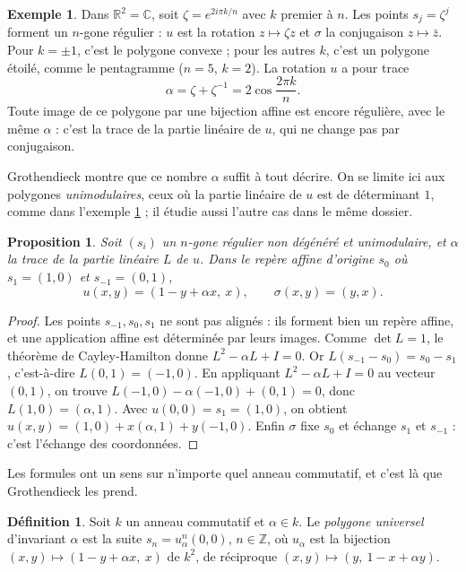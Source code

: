 \documentclass[11pt,a4paper]{article}
\theoremstyle{plain}
\newtheorem{proposition}[theoreme]{Proposition}
\theoremstyle{definition}
\newtheorem{definition}[theoreme]{Définition}
\newtheorem{exemple}[theoreme]{Exemple}
\theoremstyle{remark}
\newcommand{\Z}{\mathbb{Z}}
\newcommand{\R}{\mathbb{R}}
\newcommand{\C}{\mathbb{C}}
\begin{document}
\begin{exemple}\label{ex:reels}
Dans $\R^2=\C$, soit $\zeta=e^{2i\pi k/n}$ avec $k$ premier à $n$. Les points $s_j=\zeta^j$ forment un $n$-gone régulier : $u$ est la rotation $z\mapsto\zeta z$ et $\sigma$ la conjugaison $z\mapsto\bar z$. Pour $k=\pm1$, c'est le polygone convexe ; pour les autres $k$, c'est un polygone étoilé, comme le pentagramme ($n=5$, $k=2$). La rotation $u$ a pour trace
\[
  \alpha=\zeta+\zeta^{-1}=2\cos\frac{2\pi k}n .
\]
Toute image de ce polygone par une bijection affine est encore régulière, avec le même $\alpha$ : c'est la trace de la partie linéaire de $u$, qui ne change pas par conjugaison.
\end{exemple}

Grothendieck montre que ce nombre $\alpha$ suffit à tout décrire. On se limite ici aux polygones \emph{unimodulaires}, ceux où la partie linéaire de $u$ est de déterminant $1$, comme dans l'exemple \ref{ex:reels} ; il étudie aussi l'autre cas dans le même dossier.

\begin{proposition}\label{prop:universel}
Soit $(s_i)$ un $n$-gone régulier non dégénéré et unimodulaire, et $\alpha$ la trace de la partie linéaire $L$ de $u$. Dans le repère affine d'origine $s_0$ où $s_1=(1,0)$ et $s_{-1}=(0,1)$,
\[
  u(x,y)=(1-y+\alpha x,\ x),\qquad \sigma(x,y)=(y,x).
\]
\end{proposition}

\begin{proof}
Les points $s_{-1},s_0,s_1$ ne sont pas alignés : ils forment bien un repère affine, et une application affine est déterminée par leurs images. Comme $\det L=1$, le théorème de Cayley-Hamilton donne $L^2-\alpha L+I=0$. Or $L(s_{-1}-s_0)=s_0-s_1$, c'est-à-dire $L(0,1)=(-1,0)$. En appliquant $L^2-\alpha L+I=0$ au vecteur $(0,1)$, on trouve $L(-1,0)-\alpha(-1,0)+(0,1)=0$, donc $L(1,0)=(\alpha,1)$. Avec $u(0,0)=s_1=(1,0)$, on obtient $u(x,y)=(1,0)+x(\alpha,1)+y(-1,0)$. Enfin $\sigma$ fixe $s_0$ et échange $s_1$ et $s_{-1}$ : c'est l'échange des coordonnées.
\end{proof}

Les formules ont un sens sur n'importe quel anneau commutatif, et c'est là que Grothendieck les prend.

\begin{definition}\label{def:universel}
Soit $k$ un anneau commutatif et $\alpha\in k$. Le \emph{polygone universel} d'invariant $\alpha$ est la suite $s_n=u_\alpha^n(0,0)$, $n\in\Z$, où $u_\alpha$ est la bijection $(x,y)\mapsto(1-y+\alpha x,\ x)$ de $k^2$, de réciproque $(x,y)\mapsto(y,\ 1-x+\alpha y)$.
\end{definition}
\end{document}
